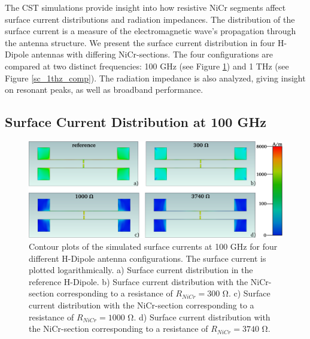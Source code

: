 The CST simulations provide insight into how resistive NiCr segments affect surface current distributions and
radiation impedances. The distribution of the surface current is a measure of the electromagnetic wave's propagation through the antenna structure.  We present the surface current distribution in four H-Dipole antennas with differing NiCr-sections. The four configurations are compared at two distinct frequencies: \num{100} \si{\giga \hertz} (see Figure \ref{sc_100ghz_comp}) and \num{1} \si{\tera \hertz} (see Figure \ref{sc_1thz_comp}). The radiation impedance is also analyzed, giving insight on resonant peaks, as well as broadband performance.

\subsection{Surface Current Distribution at 100 GHz}

\begin{figure}[!]
    \centering
    \includegraphics[width=\linewidth]{figures/Contour_Plots_v2/100Ghz_SC_sim_plots.pdf}
    \caption{Contour plots of the simulated surface currents at \num{100} \si{\giga \hertz} for four different H-Dipole antenna configurations. The surface current is plotted logarithmically. a) Surface current distribution in the reference H-Dipole. b) Surface current distribution with the NiCr-section corresponding to a resistance of $R_{NiCr} = 300$ \si{\ohm}. c) Surface current distribution with the NiCr-section corresponding to a resistance of $R_{NiCr} = 1000$ \si{\ohm}. d) Surface current distribution with the NiCr-section corresponding to a resistance of $R_{NiCr} = 3740$ \si{\ohm}.}
    \label{sc_100ghz_comp}
\end{figure}
 
